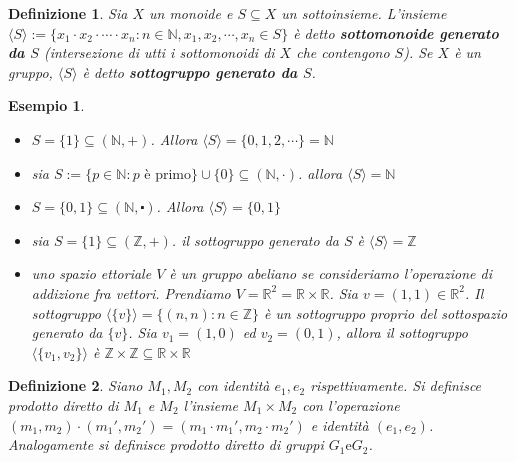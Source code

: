 \documentclass[a4paper,12pt]{article}
\theoremstyle{def}
\newtheorem*{definition}{Definizione}
\theoremstyle{prop}
\theoremstyle{esempio}
\newtheorem*{example}{Esempio}
\theoremstyle{dimostrazione}
\theoremstyle{teo}
\theoremstyle{osservazione}
\begin{document}
\begin{definition}
    Sia \(X\) un monoide e \(S \subseteq X\) un sottoinsieme. L'insieme \(\langle S \rangle := \{ x_1
    \cdot x_2 \cdot \cdots \cdot x_n : n \in \mathbb{N}, x_1,x_2,\cdots,x_n \in S \}\) è detto
    \textbf{sottomonoide generato da \(S\)} (intersezione di utti i sottomonoidi di \(X\) che contengono
    \(S\)). Se \(X\) è un gruppo, \(\langle S \rangle\) è detto \textbf{sottogruppo generato da \(S\)}.
\end{definition}

\begin{example}
    \
    \begin{itemize}
        \item \(S = \{1\} \subseteq  (\mathbb{N}, +)\). Allora \(\langle S \rangle = \{0,1,2,\cdots\} = \mathbb{N}\)
        \item sia \(S:= \{p \in \mathbb{N} : p \text{ è primo}\} \cup \{0\} \subseteq (\mathbb{N}, \cdot)\).
              allora \(\langle S \rangle = \mathbb{N}\)
        \item \(S = \{0,1\} \subseteq (\mathbb{N} , \centerdot)\). Allora \(\langle S \rangle = \{0,1\}\)
        \item sia \(S = \{1\} \subseteq  (\mathbb{Z}, +)\). il sottogruppo generato da \(S\) è \(\langle S \rangle
              = \mathbb{Z}\)
        \item uno spazio ettoriale \(V\) è un gruppo abeliano se consideriamo l'operazione di addizione fra vettori.
              Prendiamo \(V=\mathbb{R}^2 = \mathbb{R} \times \mathbb{R}\). Sia \(v = (1,1) \in \mathbb{R}^2\).
              Il sottogruppo \(\langle \{v\} \rangle = \{(n,n): n \in \mathbb{Z}\}\) è un sottogruppo proprio del
              sottospazio generato da \(\{v\}\). Sia \(v_1 = (1,0)\) ed \(v_2 = (0,1)\), allora il sottogruppo
              \(\langle \{v_1,v_2\} \rangle\) è \(\mathbb{Z} \times \mathbb{Z} \subseteq  \mathbb{R} \times \mathbb{R}\)
    \end{itemize}
\end{example}


\begin{definition}
    Siano \(M_1 , M_2\) con identità \(e_1 , e_2\) rispettivamente. Si definisce prodotto diretto di \(M_1\)
    e \(M_2\) l'insieme \(M_1 \times M_2\) con l'operazione \((m_1,m_2) \cdot (m_1',m_2') = (m_1 \cdot m_1',
    m_2 \cdot m_2')\) e identità \((e_1,e_2)\). Analogamente si definisce prodotto diretto di
    gruppi \(G_1 \text{e} G_2\).
\end{definition}
\end{document}
